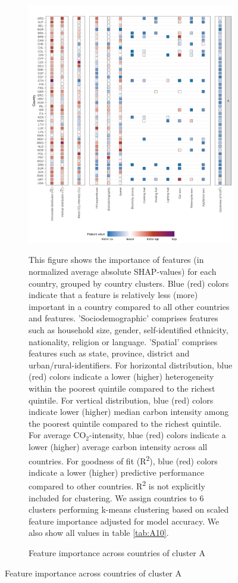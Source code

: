 \documentclass[12pt, a4paper]{article}
\newenvironment{subcaption2}
{\strut
\vspace{-5pt}
\begin{minipage}[b]{0.9\textwidth}
  \hspace*{-\parindent}
  \footnotesize}
 {\end{minipage}}
\begin{document}
\clearpage
\begin{figure}[ht!]
    \centering
    \caption{Feature importance across countries by cluster}\label{fig:fig_4}
    \begin{subfigure}[b]{\textwidth}
    \centering
    \caption{Feature importance across countries of cluster A}\label{fig:fig_4_1}
    \includegraphics{1_Figures/Figure 4/Figure_4_Corrected_1.jpg}
     \begin{subcaption2}
    This figure shows the importance of features (in normalized average absolute SHAP-values) for each country, grouped by country clusters. Blue (red) colors indicate that a feature is relatively less (more) important in a country compared to all other countries and features. 'Sociodemographic' comprises features such as household size, gender, self-identified ethnicity, nationality, religion or language. 'Spatial' comprises features such as state, province, district and urban/rural-identifiers. For horizontal distribution, blue (red) colors indicate a lower (higher) heterogeneity within the poorest quintile compared to the richest quintile. For vertical distribution, blue (red) colors indicate lower (higher) median carbon intensity among the poorest quintile compared to the richest quintile. For average CO$_{2}$-intensity, blue (red) colors indicate a lower (higher) average carbon intensity across all countries. For goodness of fit (R\textsuperscript{2}), blue (red) colors indicate a lower (higher) predictive performance compared to other countries. R\textsuperscript{2} is not explicitly included for clustering.
    We assign countries to 6 clusters performing k-means clustering based on scaled feature importance adjusted for model accuracy. We also show all values in table \ref{tab:A10}.
    \end{subcaption2}
    \end{subfigure}
\end{figure}
\end{document}
